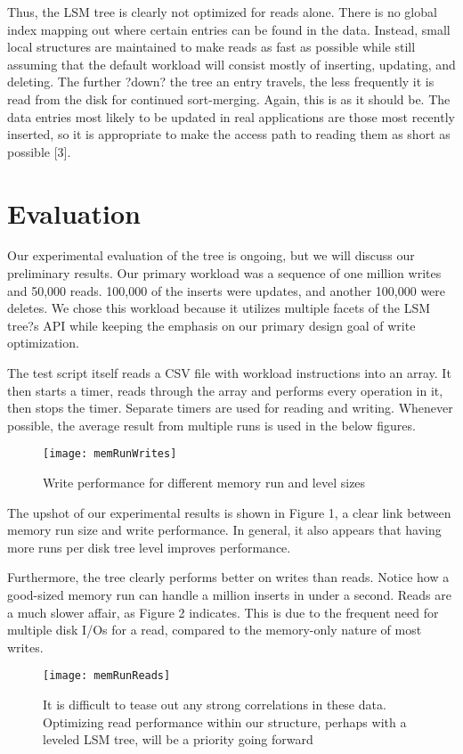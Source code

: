 \documentclass[12pt]{article}
\begin{document}
	Thus, the LSM tree is clearly not optimized for reads alone. There is no global index mapping out where certain entries can be found in the data. Instead, small local structures are maintained to make reads as fast as possible while still assuming that the default workload will consist mostly of inserting, updating, and deleting. The further ?down? the tree an entry travels, the less frequently it is read from the disk for continued sort-merging. Again, this is as it should be. The data entries most likely to be updated in real applications are those most recently inserted, so it is appropriate to make the access path to reading them as short as possible [3].

\section{Evaluation}
\indent \indent Our experimental evaluation of the tree is ongoing, but we will discuss our preliminary results. Our primary workload was a sequence of one million writes and 50,000 reads. 100,000 of the inserts were updates, and another 100,000 were deletes. We chose this workload because it utilizes multiple facets of the LSM tree?s API while keeping the emphasis on our primary design goal of write optimization.

The test script itself reads a CSV file with workload instructions into an array. It then starts a timer, reads through the array and performs every operation in it, then stops the timer. Separate timers are used for reading and writing. Whenever possible, the average result from multiple runs is used in the below figures.
  \begin{figure}[h!]
 \centering
  \texttt{[image: memRunWrites]}
 \caption{Write performance for different memory run and level sizes}
 \end{figure}
The upshot of our experimental results is shown in Figure 1, a clear link between memory run size and write performance. In general, it also appears that having more runs per disk tree level improves performance. 

Furthermore, the tree clearly performs better on writes than reads. Notice how a good-sized memory run can handle a million inserts in under a second. Reads are a much slower affair, as Figure 2 indicates. This is due to the frequent need for multiple disk I/Os for a read, compared to the memory-only nature of most writes.
  \begin{figure}[h!]
 \centering
  \texttt{[image: memRunReads]}
 \caption{It is difficult to tease out any strong correlations in these data. Optimizing read performance within our structure, perhaps with a leveled LSM tree, will be a priority going forward}
 \end{figure}
\end{document}
